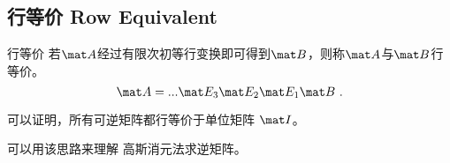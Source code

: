 
\subsection{行等价 Row Equivalent}
\begin{definition}{行等价}
若$\mat A$经过有限次初等行变换即可得到$\mat B$，则称$\mat A$与$\mat B$行等价。
\begin{equation}
\mat A= ... \mat E_3 \mat E_2 \mat E_1 \mat  B~.
\end{equation}
\end{definition}

可以证明，所有可逆矩阵都行等价于单位矩阵 $\mat I$。

可以用该思路来理解 高斯消元法求逆矩阵。

